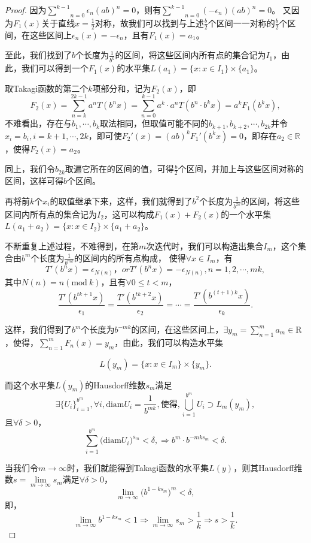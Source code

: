 \begin{proof}
    因为$\underset{n=0}{\overset{k-1}{\sum}}\epsilon_n(ab)^n=0$，则有$\underset{n=0}{\overset{k-1}{\sum}}(-\epsilon_n)(ab)^n=0$。
    又因为$F_1(x)$关于直线$x=\frac{1}{2}$对称，故我们可以找到与上述$\frac{b}{2}$个区间一一对称的$\frac{b}{2}$个区间，在这些区间上$\epsilon_n(x)=-\epsilon_n$，且有$F_1(x)=a_1$。

    至此，我们找到了$b$个长度为$\frac{1}{b^k}$的区间，将这些区间内所有点的集合记为$I_1$，由此，我们可以得到一个$F_1(x)$的水平集$L(a_1)=\{x:x\in I_1\}\times\{a_1\}$。

    取Takagi函数的第二个$k$项部分和，记为$F_2(x)$，即
    $$
        F_2(x)=\sum_{n=k}^{2k-1}a^nT(b^nx)=\sum_{n=0}^{k-1}a^k\cdot a^nT(b^n\cdot b^kx)=a^kF_1(b^kx),
    $$
    不难看出，存在与$b_1,\cdots,b_k$取法相同，但取值可能不同的$b_{k+1},b_{k+2},\cdots,b_{2k}$并令$x_i=b_i,i=k+1,\cdots,2k$，即可使$F_2'(x)=(ab)^kF_1'(b^kx)=0$，即存在$a_2\in\mathbb{R}$，使得$F_2(x)=a_2$。

    同上，我们令$b_{2k}$取遍它所在的区间的值，可得$\frac{b}{2}$个区间，并加上与这些区间对称的区间，这样可得$b$个区间。

    再将前$k$个$x_i$的取值继承下来，这样，我们就得到了$b^2$个长度为$\frac{1}{b^{2k}}$的区间，将这些区间内所有点的集合记为$I_2$，这可以构成$F_1(x)+F_2(x)$的一个水平集$L(a_1+a_2)=\{x:x\in I_2\}\times\{a_1+a_2\}$。

    不断重复上述过程，不难得到，在第$m$次迭代时，我们可以构造出集合$I_m$，这个集合由$b^m$个长度为$\frac{1}{b^{mk}}$的区间内的所有点构成，
    使得$\forall x\in I_m$，有
    $$T'(b^nx)=\epsilon_{N(n)}，orT'(b^nx)=-\epsilon_{N(n)},n=1,2,\cdots,mk,$$
    其中$N(n)=n(\mathrm{mod}~k)$，且有$\forall 0\le t<m$，
    $$
            \frac{T'(b^{tk+1}x)}{\epsilon_1}=\frac{T'(b^{tk+2}x)}{\epsilon_2}=\cdots=\frac{T'(b^{(t+1)k}x)}{\epsilon_k}.
    $$

    这样，我们得到了$b^m$个长度为$b^{-mk}$的区间，在这些区间上，$\exists y_m= \sum_{n=1}^ma_m\in\mathrm{R}$，使得，$\sum_{n=1}^mF_n(x)=y_m$，由此，我们可以构造水平集

    $$
        L(y_m)=\{x:x\in I_m\}\times\{y_m\}.
    $$

    而这个水平集$L(y_m)$的Hausdorff维数$s_m$满足
    $$
        \exists \{U_i\}_{i=1}^{b^m},\forall i,\mathrm{diam}U_i=\frac{1}{b^{mk}},\mbox{使得},\bigcup_{i=1}^{b^m}U_i\supset L_m(y_m),
    $$
   且$\forall \delta>0$，
    $$
        \sum_{i=1}^{b^m}\big(\mathrm{diam}U_i\big)^{s_m}<\delta,\Rightarrow
        b^{m}\cdot b^{-mks_m}<\delta.
    $$

    当我们令$m\rightarrow\infty$时，我们就能得到Takagi函数的水平集$L(y)$，则其Hausdorff维数$s=\lim\limits_{m\rightarrow\infty}s_m$满足$\forall\delta>0$，
    $$
        \lim\limits_{m\rightarrow\infty}\big(b^{1-ks_m}\big)^{m}<\delta,
    $$
    即，
    $$
        \lim\limits_{m\rightarrow\infty}b^{1-ks_m}<1\Rightarrow \lim\limits_{m\rightarrow\infty}s_m>\frac{1}{k}\Rightarrow s>\frac{1}{k}.
    $$

\end{proof}

